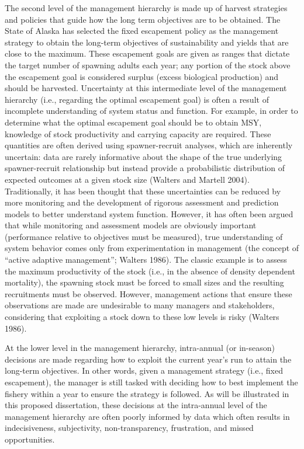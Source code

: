 \documentclass[12pt,]{book}
\theoremstyle{definition}
\theoremstyle{definition}
\theoremstyle{definition}
\theoremstyle{remark}
\begin{document}
The second level of the management hierarchy is made up of harvest
strategies and policies that guide how the long term objectives are to
be obtained. The State of Alaska has selected the fixed escapement
policy as the management strategy to obtain the long-term objectives of
sustainability and yields that are close to the maximum. These
escapement goals are given as ranges that dictate the target number of
spawning adults each year; any portion of the stock above the escapement
goal is considered surplus (excess biological production) and should be
harvested. Uncertainty at this intermediate level of the management
hierarchy (i.e., regarding the optimal escapement goal) is often a
result of incomplete understanding of system status and function. For
example, in order to determine what the optimal escapement goal should
be to obtain MSY, knowledge of stock productivity and carrying capacity
are required. These quantities are often derived using spawner-recruit
analyses, which are inherently uncertain: data are rarely informative
about the shape of the true underlying spawner-recruit relationship but
instead provide a probabilistic distribution of expected outcomes at a
given stock size (Walters and Martell 2004). Traditionally, it has been
thought that these uncertainties can be reduced by more monitoring and
the development of rigorous assessment and prediction models to better
understand system function. However, it has often been argued that while
monitoring and assessment models are obviously important (performance
relative to objectives must be measured), true understanding of system
behavior comes only from experimentation in management (the concept of
``active adaptive management''; Walters 1986). The classic example is to
assess the maximum productivity of the stock (i.e., in the absence of
density dependent mortality), the spawning stock must be forced to small
sizes and the resulting recruitments must be observed. However,
management actions that ensure these observations are made are
undesirable to many managers and stakeholders, considering that
exploiting a stock down to these low levels is risky (Walters 1986).

At the lower level in the management hierarchy, intra-annual (or
in-season) decisions are made regarding how to exploit the current
year's run to attain the long-term objectives. In other words, given a
management strategy (i.e., fixed escapement), the manager is still
tasked with deciding how to best implement the fishery within a year to
ensure the strategy is followed. As will be illustrated in this proposed
dissertation, these decisions at the intra-annual level of the
management hierarchy are often poorly informed by data which often
results in indecisiveness, subjectivity, non-transparency, frustration,
and missed opportunities.
\end{document}

